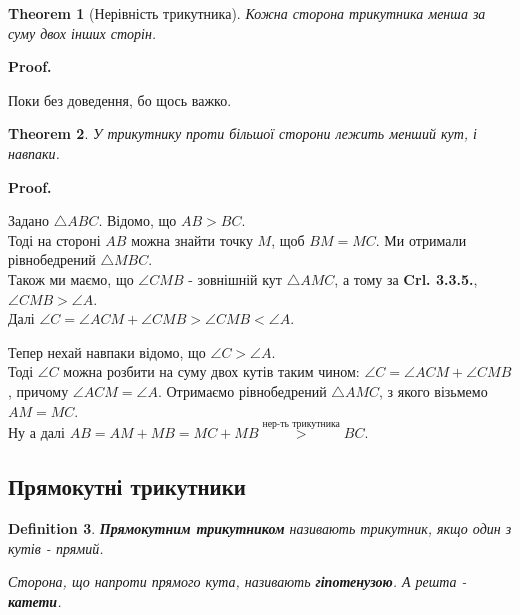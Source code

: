 \documentclass[a4paper, 10pt]{article}
\makeatletter
\theoremstyle{theoremdd}
\newtheorem{theorem}{Theorem}[subsection]
\theoremstyle{theoremdd}
\theoremstyle{theoremdd}
\newtheorem{definition}[theorem]{Definition}
\theoremstyle{theoremdd}
\theoremstyle{theoremdd}
\theoremstyle{theoremdd}
\theoremstyle{theoremdd}
\theoremstyle{theoremdd}
\theoremstyle{theoremdd}
\renewenvironment{proof}[1][Proof.\\]{\par
\pushQED{\hfill \qed}%
\normalfont \topsep6\p@\@plus6\p@\relax
\trivlist
\item\relax
{\bfseries
#1\@addpunct{.}}\hspace\labelsep\ignorespaces
}{%
\popQED\endtrivlist\@endpefalse
}
\makeatother
\begin{document}
\begin{theorem}[Нерівність трикутника]
Кожна сторона трикутника менша за суму двох інших сторін.
\end{theorem}

\begin{proof}
Поки без доведення, бо щось важко.
\end{proof}

\begin{theorem}
У трикутнику проти більшої сторони лежить менший кут, і навпаки.
\end{theorem}

\begin{proof}
Задано $\triangle ABC$. Відомо, що $AB > BC$.\\
Тоді на стороні $AB$ можна знайти точку $M$, щоб $BM = MC$. Ми отримали рівнобедрений $\triangle MBC$.\\
Також ми маємо, що $\angle CMB$ - зовнішній кут $\triangle AMC$, а тому за \textbf{Crl. 3.3.5.}, $\angle CMB > \angle A$.\\
Далі $\angle C = \angle ACM + \angle CMB > \angle CMB < \angle A$.
\begin{figure}[H]
\centering
{}
\end{figure}
Тепер нехай навпаки відомо, що $\angle C > \angle A$.\\
Тоді $\angle C$ можна розбити на суму двох кутів таким чином: $\angle C = \angle ACM + \angle CMB$, причому $\angle ACM = \angle A$. Отримаємо рівнобедрений $\triangle AMC$, з якого візьмемо $AM = MC$.\\
Ну а далі $AB = AM + MB = MC + MB \overset{\text{нер-ть трикутника}}{>} BC$.
\end{proof}

\subsection{Прямокутні трикутники}
\begin{definition}
\textbf{Прямокутним трикутником} називають трикутник, якщо один з кутів - прямий.
\begin{figure}[H]
\centering
{}
\end{figure}
Сторона, що напроти прямого кута, називають \textbf{гіпотенузою}. А решта - \textbf{катети}.
\end{definition}
\end{document}
